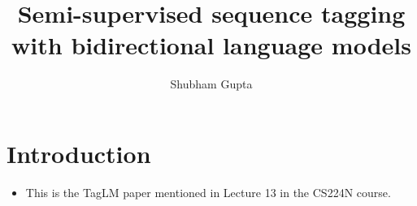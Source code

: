 \documentclass[a4paper]{article}
\title{Semi-supervised sequence tagging with bidirectional language models}
\author{Shubham Gupta}
\begin{document}
\maketitle
\section{Introduction}
\begin{itemize}
    \item This is the TagLM paper mentioned in Lecture 13 in the CS224N course.
\end{itemize}
\end{document}
